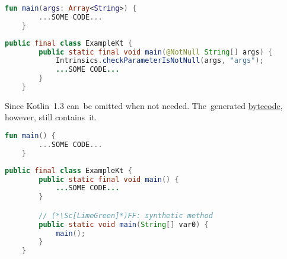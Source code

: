 \begin{lstlisting}[language=Kotlin,title={A~tandalone main function in a~file \textit{Example.kt}}]
    fun main(args: Array<String>) {
        ...SOME CODE...
    }
\end{lstlisting}

\begin{lstlisting}[language=Java,title={Corresponding Java code}]
    public final class ExampleKt {
        public static final void main(@NotNull String[] args) {
            Intrinsics.checkParameterIsNotNull(args, "args");
            ...SOME CODE...
        }
    }
\end{lstlisting}

\noindent Since Kotlin~1.3  can~be omitted when not needed.
The~generated \hyperref[javabytecode]{bytecode}, however, still contains~it.

\begin{lstlisting}[language=Kotlin,title={A~tandalone main function without \mbit{args}}]
    fun main() {
        ...SOME CODE...
    }
\end{lstlisting}

\begin{lstlisting}[language=Java,title={Corresponding Java code}]
    public final class ExampleKt {
        public static final void main() {
            ...SOME CODE...
        }

        // (*\Sc[LimeGreen]*)FF: synthetic method
        public static void main(String[] var0) {
            main();
        }
    }
\end{lstlisting}
